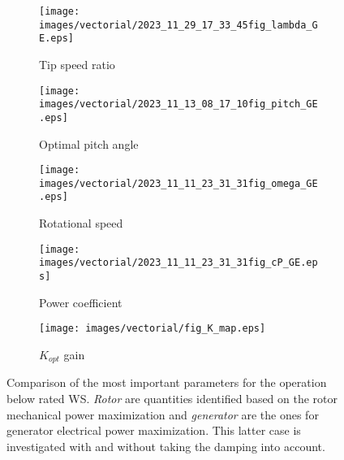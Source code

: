 \begin{figure}[htb]
  \begin{subfigure}{0.5\textwidth}
    \centering
    \texttt{[image: images/vectorial/2023\_11\_29\_17\_33\_45fig\_lambda\_GE.eps]}
    \caption{Tip speed ratio}
    \label{fig:2023_06_24_15_57_04fig_lambda_GE}
  \end{subfigure}
  \begin{subfigure}{0.5\textwidth}
    \centering
    \texttt{[image: images/vectorial/2023\_11\_13\_08\_17\_10fig\_pitch\_GE.eps]}
    \caption{Optimal pitch angle}
    \label{fig:2023_06_24_15_57_04fig_pitch_GE}
  \end{subfigure}
  \begin{subfigure}{0.5\textwidth}
    \centering
    \texttt{[image: images/vectorial/2023\_11\_11\_23\_31\_31fig\_omega\_GE.eps]}
    \caption{Rotational speed}
    \label{fig:2023_07_10_14_18_25fig_omega_GE}
  \end{subfigure}
  \begin{subfigure}{0.5\textwidth}
    \centering
    \texttt{[image: images/vectorial/2023\_11\_11\_23\_31\_31fig\_cP\_GE.eps]}
    \caption{Power coefficient}
    \label{fig:2023_06_24_15_57_04fig_cP_GE}
  \end{subfigure}
  \begin{subfigure}{0.5\textwidth}
    \centering
    \texttt{[image: images/vectorial/fig\_K\_map.eps]}
    \caption{$K_{opt}$ gain}
    \label{fig:fig_K_map}
  \end{subfigure}
  \caption{Comparison of the most important parameters for the operation below rated WS. \textit{Rotor} are quantities identified based on the rotor mechanical power maximization and \textit{generator} are the ones for generator electrical power maximization. This latter case is investigated with and without taking the damping into account.}
  \label{fig:parameters_for_below_rated}
\end{figure}

